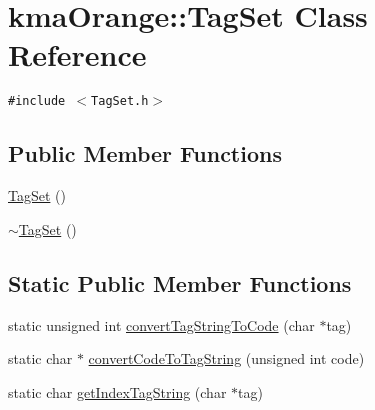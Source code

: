 \hypertarget{classkmaOrange_1_1TagSet}{
\section{kmaOrange::TagSet Class Reference}
\label{classkmaOrange_1_1TagSet}
}
{\tt \#include $<$TagSet.h$>$}

\subsection*{Public Member Functions}
\begin{CompactItemize}
\item 
\hyperlink{classkmaOrange_1_1TagSet_630d96e4b22bf3692dc0276b0b19ebbf}{TagSet} ()
\item 
\hyperlink{classkmaOrange_1_1TagSet_ac463802c81bbc7465c54768398d373d}{$\sim$TagSet} ()
\end{CompactItemize}
\subsection*{Static Public Member Functions}
\begin{CompactItemize}
\item 
static unsigned int \hyperlink{classkmaOrange_1_1TagSet_0d5649071e5a2b636b75b67ed19a0c11}{convertTagStringToCode} (char $\ast$tag)
\item 
static char $\ast$ \hyperlink{classkmaOrange_1_1TagSet_e3618e2fef4cb6394b18aad656231449}{convertCodeToTagString} (unsigned int code)
\item 
static char \hyperlink{classkmaOrange_1_1TagSet_9e1b857c9730694ee2a9c56402ba73d6}{getIndexTagString} (char $\ast$tag)
\end{CompactItemize}
